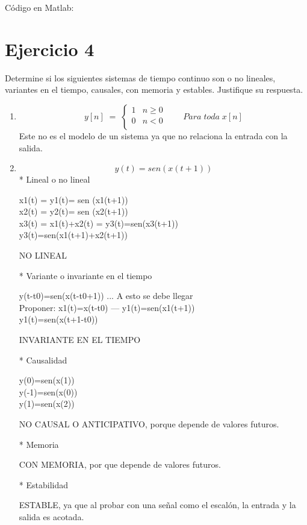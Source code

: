 \documentclass[10pt,a4paper]{report}
\begin{document}
\begin{enumerate}
Código en Matlab:
    
    
\end{enumerate}

\section{Ejercicio 4}
Determine si los siguientes sistemas de tiempo continuo son o no lineales, variantes en el tiempo, causales, con memoria y estables. Justifique su respuesta.
\begin{enumerate}
  \item  \[ y\left[n\right]\;=\;\left\{\begin{array}{lc}
                                     1&n\geq0 \\
                                     0&n<0 \\ 
                                   \end{array}\right.\qquad Para\;toda\;x\left[n\right]
\]
Este no es el modelo de un sistema ya que no relaciona la entrada con la salida.
  \item
    \begin{equation*}
y(t)=sen(x(t+1))
    \end{equation*}
* Lineal o no lineal

   x1(t) = y1(t)= sen (x1(t+1))\\
   x2(t) = y2(t)= sen (x2(t+1))\\
   x3(t) = x1(t)+x2(t) = y3(t)=sen(x3(t+1))\\
                         y3(t)=sen(x1(t+1)+x2(t+1))

 NO LINEAL

* Variante o invariante en el tiempo

  y(t-t0)=sen(x(t-t0+1)) ... A esto se debe llegar\\
  Proponer: x1(t)=x(t-t0) --- y1(t)=sen(x1(t+1))\\
  y1(t)=sen(x(t+1-t0))

  INVARIANTE EN EL TIEMPO

* Causalidad

y(0)=sen(x(1))\\
y(-1)=sen(x(0))\\
y(1)=sen(x(2))

NO CAUSAL O ANTICIPATIVO, porque depende de valores futuros.

* Memoria

CON MEMORIA, por que depende de valores futuros.

* Estabilidad

ESTABLE, ya que al probar con una señal como el escalón, la entrada y la salida es acotada.

\end{enumerate}
\end{document}
